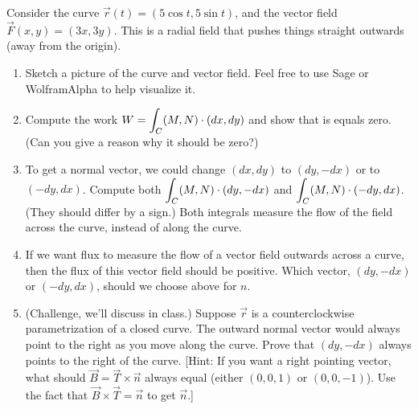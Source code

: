 \begin{problem}
 Consider the curve $\vec r(t) = (5\cos t, 5\sin t)$, and the vector field $\vec F(x,y) = (3x, 3y)$. This is a radial field that pushes things straight outwards (away from the origin).  
\begin{enumerate}
	\item Sketch a picture of the curve and vector field. Feel free to use Sage or WolframAlpha to help visualize it.
	\item Compute the work $\displaystyle W= \int_C (M,N)\cdot (dx,dy)$ and show that is equals zero. (Can you give a reason why it should be zero?) 
	\item To get a normal vector, we could change $(dx,dy)$ to $(dy,-dx)$ or to $(-dy,dx)$. Compute both 
$\displaystyle \int_C (M,N)\cdot (dy,-dx)$ and $\displaystyle \int_C (M,N)\cdot (-dy,dx)$. (They should differ by a sign.) Both integrals measure the flow of the field across the curve, instead of along the curve. 
	\item If we want flux to measure the flow of a vector field outwards across a curve, then the flux of this vector field should be positive.  Which vector, $(dy,-dx)$ or $(-dy,dx)$,  should we choose above for $n$. 
	\item (Challenge, we'll discuss in class.) Suppose $\vec r$ is a counterclockwise parametrization of a closed curve.  The outward normal vector would always point to the right as you move along the curve.  Prove that $(dy,-dx)$ always points to the right of the curve. [Hint: If you want a right pointing vector, what should $\vec B=\vec T\times \vec n$ always equal (either $(0,0,1)$ or $(0,0,-1)$). Use the fact that $\vec B\times \vec T = \vec n$ to get $\vec n$.]
\end{enumerate}

\end{problem}

 

